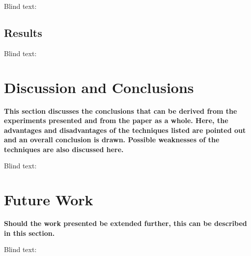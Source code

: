 Blind text:

\lipsum[1]

\subsection{Results}
\label{subsec:results}

Blind text:

\lipsum[1]


\section{Discussion and Conclusions}
\label{sec:discussion_conclusion}

\textbf{This section discusses the conclusions that can be derived from the
experiments presented and from the paper as a whole. Here, the advantages and
disadvantages of the techniques listed are pointed out and an overall conclusion
is drawn. Possible weaknesses of the techniques are also discussed here.}

Blind text:

\lipsum[1-2]




\section{Future Work}
\label{sec:future_work}

\textbf{Should the work presented be extended further, this can be described in
this section.}

Blind text:

\lipsum[1-2]
